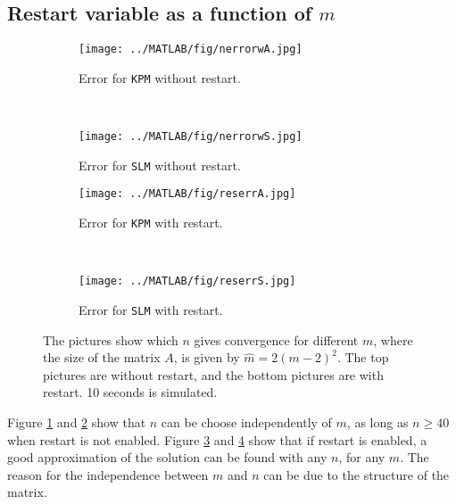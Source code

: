 \subsection{Restart variable as a function of $m$} %
\begin{figure}[H]
        \centering
        \begin{subfigure}[b]{0.3\textwidth}
                \texttt{[image: ../MATLAB/fig/nerrorwA.jpg]}
                \caption{ Error for \texttt{KPM} without restart. }
                \label{fig:nerrorwA}
        \end{subfigure}
        ~
        \begin{subfigure}[b]{0.3\textwidth}
                \texttt{[image: ../MATLAB/fig/nerrorwS.jpg]}
                \caption{ Error for \texttt{SLM} without restart. }
                \label{fig:nerrorwS}
        \end{subfigure}
        
		\begin{subfigure}[b]{0.3\textwidth}
                \texttt{[image: ../MATLAB/fig/reserrA.jpg]}
                \caption{ Error for \texttt{KPM} with restart. }
                \label{fig:reserrA}
        \end{subfigure}
		~
		\begin{subfigure}[b]{0.3\textwidth}
                \texttt{[image: ../MATLAB/fig/reserrS.jpg]}
                \caption{ Error for \texttt{SLM} with restart. }
                \label{fig:reseneS}
        \end{subfigure}
        \caption{ The pictures show which $n$ gives convergence for different $m$, where the size of the matrix $A$, is given by $\hat{m} = 2(m-2)^2$. The top pictures are without restart, and the bottom pictures are with restart. 10 seconds is simulated. }
        \label{fig:n}
\end{figure}
\noindent Figure \ref{fig:nerrorwA} and \ref{fig:nerrorwS} show that $n$ can be choose independently of $m$, as long as $n \geq 40$ when restart is not enabled. Figure \ref{fig:reserrA} and \ref{fig:reseneS} show that if restart is enabled, a good approximation of the solution can be found with any $n$, for any $m$. The reason for the independence between $m$ and $n$ can be due to the structure of the matrix.%


